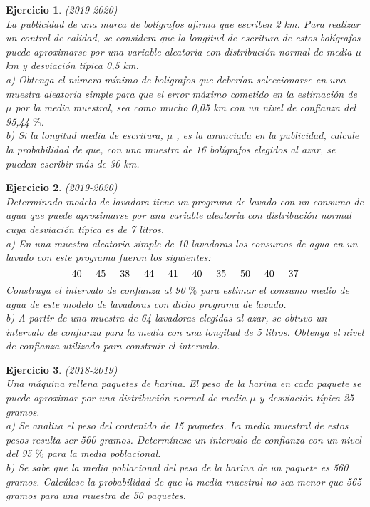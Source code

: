 \documentclass[12pt, a4paper]{amsart}
\newtheorem{ejer}{Ejercicio}
\begin{document}
\begin{ejer}\em (2019-2020)\\
La publicidad de una marca de bolígrafos afirma que escriben 2 km. Para realizar un control de calidad, se
considera que la longitud de escritura de estos bolígrafos puede aproximarse por una variable aleatoria con
distribución normal de media $\mu$ km y desviación típica 0,5 km.\\
a) Obtenga el número mínimo de bolígrafos que deberían seleccionarse en una muestra aleatoria simple para
que el error máximo cometido en la estimación de $\mu$ por la media muestral, sea como mucho 0,05 km con un
nivel de confianza del 95,44 $\%$.\\
b) Si la longitud media de escritura, $\mu$ , es la anunciada en la publicidad, calcule la probabilidad de que, con una
muestra de 16 bolígrafos elegidos al azar, se puedan escribir más de 30 km.
\end{ejer}

\begin{ejer}\em (2019-2020)\\
Determinado modelo de lavadora tiene un programa de lavado con un consumo de agua que puede aproximarse
por una variable aleatoria con distribución normal cuya desviación típica es de 7 litros.\\
a) En una muestra aleatoria simple de 10 lavadoras los consumos de agua en un lavado con este programa
fueron los siguientes:
\[40\hspace*{5mm}45 \hspace*{5mm} 38\hspace*{5mm} 44\hspace*{5mm} 41\hspace*{5mm} 40\hspace*{5mm} 35\hspace*{5mm} 50\hspace*{5mm} 40\hspace*{5mm} 37\]
Construya el intervalo de confianza al 90 $\%$ para estimar el consumo medio de agua de este modelo de lavadoras
con dicho programa de lavado.\\
b) A partir de una muestra de 64 lavadoras elegidas al azar, se obtuvo un intervalo de confianza para la media
con una longitud de 5 litros. Obtenga el nivel de confianza utilizado para construir el intervalo.
\end{ejer}


\begin{ejer}\em (2018-2019)\\
Una máquina rellena paquetes de harina. El peso de la harina en cada paquete se puede aproximar por una
distribución normal de media $\mu$ y desviación típica 25 gramos.\\
a) Se analiza el peso del contenido de 15 paquetes. La media muestral de estos pesos resulta ser 560 gramos.
Determínese un intervalo de confianza con un nivel del 95 $\%$ para la media poblacional.\\
b) Se sabe que la media poblacional del peso de la harina de un paquete es 560 gramos. Calcúlese la
probabilidad de que la media muestral no sea menor que 565 gramos para una muestra de 50 paquetes.
\end{ejer}
\end{document}
